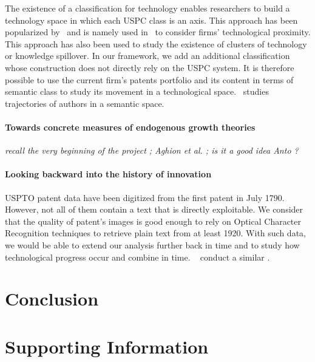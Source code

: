 \documentclass[10pt,A4]{article}
\begin{document}
The existence of a classification for technology enables researchers to build a technology space in which each USPC class is an axis. This approach has been popularized by~\cite{Jaffe1986distance} and is namely used in~\cite{Bloom2005distance} to consider firms' technological proximity. This approach has also been used to study the existence of clusters of technology or knowledge spillover. In our framework, we add an additional classification whose construction does not directly rely on the USPC system. It is therefore possible to use the current firm's patents portfolio and its content in terms of semantic class to study its movement in a technological space.~\cite{omodei2014social} studies trajectories of authors in a semantic space.



\paragraph{Towards concrete measures of endogenous growth theories}

\textit{recall the very beginning of the project ; Aghion et al. ; is it a good idea Anto ?}


\paragraph{Looking backward into the history of innovation}

USPTO patent data have been digitized from the first patent in July 1790. However, not all of them contain a text that is directly exploitable. We consider that the quality of patent's images is good enough to rely on Optical Character Recognition techniques to retrieve plain text from at least 1920. With such data, we would be able to extend our analysis further back in time and to study how technological progress occur and combine in time. ~\cite{akcigit2013mechanics} conduct a similar .



\section{Conclusion}




\section*{Supporting Information \label{sectionSI}}
\end{document}
